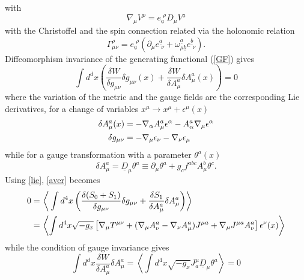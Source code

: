 \documentclass[a4paper,11pt,openright,twoside]{book}
\numberwithin{equation}{section}
\begin{document}
{{{\begin{equation}
\end{equation}
with 
\begin{equation}
	\nabla_\mu V^\rho = e_{\underline a}^{\,\,\rho} D_\mu V^{\underline a}
\end{equation}
with the Christoffel and the spin connection related via the holonomic relation 
\begin{equation}
	\Gamma^\rho_{\mu\nu}=e^{\,\,\rho}_{\underline a}\left( \partial_\mu e^{\underline a}_{\,\,\nu} +\omega^{\underline a}_{\mu \underline b} e^{\underline b}_{\,\,\nu}\right).
\end{equation}
Diffeomorphism invariance of the generating functional (\ref{GF}) gives 
\begin{equation}
	\int d^d x \left(\frac{\delta W}{\delta g_{\mu\nu}}\delta g_{\mu\nu}(x) +  \frac{\delta W}{\delta A_{\mu}^a}\delta A_{\mu}^a(x)\right)=0
	\label{aver}
\end{equation}
where the variation of the metric and the gauge fields are the corresponding Lie derivatives, for a change of variables 
$x^\mu\to x^\mu + \epsilon^\mu(x)$
\begin{align}
	\delta A_\mu^a(x) &= -\nabla_\alpha A_\mu^a \epsilon^\alpha - A^a_\alpha \nabla_\mu \epsilon^\alpha\notag\\
	\delta g_{\mu\nu}&=-\nabla_\mu \epsilon_\nu  - \nabla_\nu \epsilon_\mu \label{lie}
\end{align}
while for a gauge transformation with a parameter $\theta^a(x)$
\begin{equation}
	\delta A_\mu^a=\underline{D}_\mu \theta^a \equiv\partial_\mu \theta^a + g_c f^{a b c} A_\mu^b \theta^c.
\end{equation}
Using \eqref{lie}, \eqref{aver} becomes 
\begin{align}
	0=&\,\left\langle\, \int d^4 x \left( \frac{\delta (S_0 + S_1)}{\delta g_{\mu\nu}} \delta g_{\mu\nu} +\frac{\delta S_1}{\delta A_\mu^a} \delta A_{\mu}^a\right)
	\right\rangle\notag\\
	=&\,\left\langle \int d^4 x \sqrt{-g_x}\left[\nabla_\mu T^{\mu\nu} +(\nabla_\mu A_\nu^a -\nabla_\nu A_\mu^a) J^{\mu a} +
	\nabla_\mu J^{\mu a} A_\nu^a\right]\epsilon^\nu(x)\right\rangle
	\label{interm}
\end{align}
while the condition of gauge invariance gives 
\begin{equation}
	\int d^d x \frac{\delta W}{\delta A_{\mu}^a}\delta A_{\mu}^a=\left\langle \int d^4 x \sqrt{-g_x}J^\mu_a\underline{D}_\mu \theta^a \right\rangle=0
\end{equation}
}}}
\end{document}
